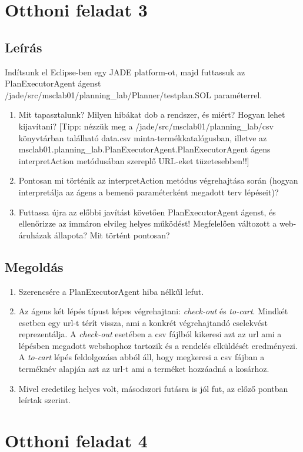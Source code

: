 \section{Otthoni feladat 3}
\subsection{Leírás}
Indítsunk el Eclipse-ben egy JADE platform-ot, majd futtassuk az PlanExecutorAgent ágenst /jade/src/msclab01/planning\_lab/Planner/testplan.SOL paraméterrel. 
\begin{enumerate}
\item Mit tapasztalunk? Milyen hibákat dob a rendszer, és miért? Hogyan lehet kijavítani? [Tipp: nézzük meg a /jade/src/msclab01/planning\_lab/csv könyvtárban található data.csv minta-termékkatalógusban, illetve az msclab01.planning\_lab.PlanExecutorAgent.PlanExecutorAgent ágens interpretAction metódusában szereplő URL-eket tüzetesebben!!] 
\item Pontosan mi történik az interpretAction metódus végrehajtása során (hogyan interpretálja az ágens a bemenő paraméterként megadott terv lépéseit)? 
\item Futtassa újra az előbbi javítást követően PlanExecutorAgent ágenst, és ellenőrizze az immáron elvileg helyes működést! Megfelelően változott a web-áruházak állapota? Mit történt pontosan?  
\end{enumerate} 
\subsection{Megoldás}
\begin{enumerate}
\item Szerencsére a PlanExecutorAgent hiba nélkűl lefut.
\item Az ágens két lépés típust képes végrehajtani: \emph{check-out} és \emph{to-cart}. Mindkét esetben egy url-t térít vissza, ami a konkrét végrehajtandó cselekvést reprezentálja. A \emph{check-out} esetében a csv fájlból kikeresi azt az url ami a lépésben megadott webshophoz tartozik és a rendelés elküldését eredményezi. A \emph{to-cart} lépés feldolgozása abból áll, hogy megkeresi a csv fájban a terméknév alapján azt az url-t ami a terméket hozzáadná a kosárhoz.
\item Mivel eredetileg helyes volt, másodszori futásra is jól fut, az előző pontban leírtak szerint.
\end{enumerate} 
\section{Otthoni feladat 4}
